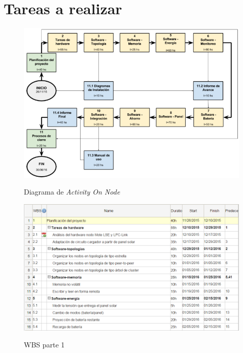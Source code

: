 \section{Tareas a realizar}
\label{sec:tareas}

\begin{figure}[h!]
	\centering
    \includegraphics[width=1\textwidth]{./Figures/AON.PNG}
	\label{fig:AON}
	\caption{Diagrama de \textit{Activity On Node}}
\end{figure}

\begin{figure}[h!]
	\centering
    \includegraphics[width=1\textwidth]{./Figures/WBS1.PNG}
	\label{fig:WBS1}
	\caption{WBS parte 1}
\end{figure}

